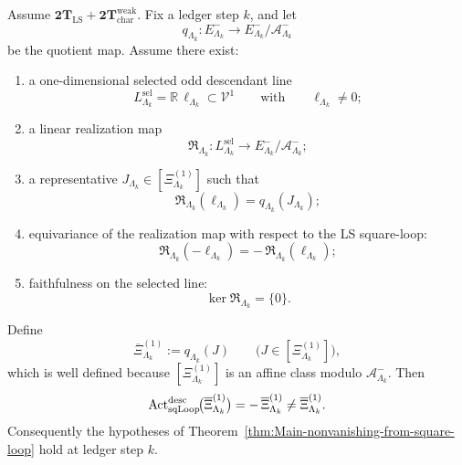 \begin{theorem}
\label{thm:Main-faithful-LS-desc}
Assume \(\mathbf{2T}_{\mathrm{LS}}+\mathbf{2T}_{\mathrm{char}}^{\mathrm{weak}}\).
Fix a ledger step \(k\), and let
\[
q_{\Lambda_k}:E^-_{\Lambda_k}\longrightarrow E^-_{\Lambda_k}/\mathcal A^-_{\Lambda_k}
\]
be the quotient map.
Assume there exist:
\begin{enumerate}[label=\textnormal{(\alph*)},leftmargin=*,itemsep=0.35em]
\item a one-dimensional selected odd descendant line
  \[
  L^{\mathrm{sel}}_{\Lambda_k}
  =
  \mathbb R\,\ell_{\Lambda_k}
  \subset\mathcal V^1
  \qquad\text{with}\qquad
  \ell_{\Lambda_k}\neq 0;
  \]
\item a linear realization map
  \[
  \mathfrak R_{\Lambda_k}:L^{\mathrm{sel}}_{\Lambda_k}
  \longrightarrow
  E^-_{\Lambda_k}/\mathcal A^-_{\Lambda_k};
  \]
\item a representative \(J_{\Lambda_k}\in[\Xi^{(1)}_{\Lambda_k}]\) such that
  \[
  \mathfrak R_{\Lambda_k}(\ell_{\Lambda_k})
  =
  q_{\Lambda_k}(J_{\Lambda_k});
  \]
\item equivariance of the realization map with respect to the LS square-loop:
  \[
  \mathfrak R_{\Lambda_k}(-\ell_{\Lambda_k})
  =
  -\,\mathfrak R_{\Lambda_k}(\ell_{\Lambda_k});
  \]
\item faithfulness on the selected line:
  \[
  \ker \mathfrak R_{\Lambda_k}=\{0\}.
  \]
\end{enumerate}
Define
\[
\overline{\Xi}^{(1)}_{\Lambda_k}
:=
q_{\Lambda_k}(J)
\qquad
\bigl(J\in[\Xi^{(1)}_{\Lambda_k}]\bigr),
\]
which is well defined because \([\Xi^{(1)}_{\Lambda_k}]\) is an affine class modulo
\(\mathcal A^-_{\Lambda_k}\).
Then
\begin{equation}
\mathrm{Act}^{\mathrm{desc}}_{\mathrm{sqLoop}}\!\big(\overline{\Xi}^{(1)}_{\Lambda_k}\big)
=
-\,\overline{\Xi}^{(1)}_{\Lambda_k}
\neq
\overline{\Xi}^{(1)}_{\Lambda_k}.
\label{eq:Main-faithful-LS-desc}
\end{equation}
Consequently the hypotheses of Theorem~\ref{thm:Main-nonvanishing-from-square-loop}
hold at ledger step \(k\).
\end{theorem}

